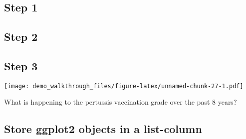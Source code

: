 \documentclass[]{article}
\newenvironment{Shaded}{\begin{snugshade}}{\end{snugshade}}
\newcommand{\KeywordTok}[1]{\textcolor[rgb]{0.13,0.29,0.53}{\textbf{#1}}}
\newcommand{\FloatTok}[1]{\textcolor[rgb]{0.00,0.00,0.81}{#1}}
\newcommand{\StringTok}[1]{\textcolor[rgb]{0.31,0.60,0.02}{#1}}
\newcommand{\OperatorTok}[1]{\textcolor[rgb]{0.81,0.36,0.00}{\textbf{#1}}}
\newcommand{\NormalTok}[1]{#1}
\begin{document}
\subsection{Step 1}\label{step-1}

\begin{Shaded}
\end{Shaded}

\subsection{Step 2}\label{step-2}

\begin{Shaded}
\end{Shaded}

\subsection{Step 3}\label{step-3}

\texttt{[image: demo\_walkthrough\_files/figure-latex/unnamed-chunk-27-1.pdf]}

What is happening to the pertussis vaccination grade over the past 8
years?

\subsection{Store ggplot2 objects in a
list-column}\label{store-ggplot2-objects-in-a-list-column}
\end{document}
